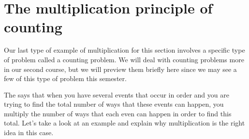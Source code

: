 \documentclass{ximera}
\begin{document}
\section{The multiplication principle of counting}

Our last type of example of multiplication for this section involves a specific type of problem called a counting problem. We will deal with counting problems more in our second course, but we will preview them briefly here since we may see a few of this type of problem this semester.

The  says that when you have several events that occur in order and you are trying to find the total number of ways that these events can happen, you multiply the number of ways that each even can happen in order to find this total. Let's take a look at an example and explain why multiplication is the right idea in this case.
\end{document}
